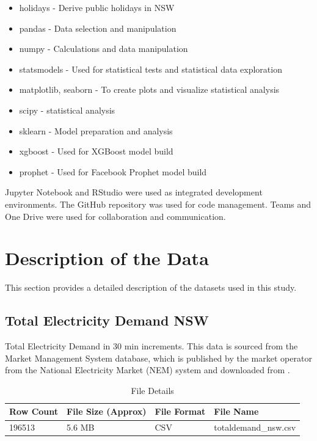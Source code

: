\documentclass[mstat,12pt]{unswthesis}
\begin{document}
\begin{itemize}
  \item holidays - Derive public holidays in NSW 
  \item pandas - Data selection and manipulation
  \item numpy - Calculations and data manipulation
  \item statsmodels - Used for statistical tests and statistical data exploration
  \item matplotlib, seaborn - To create plots and visualize statistical analysis
  \item scipy - statistical analysis
  \item sklearn - Model preparation and analysis
  \item xgboost - Used for XGBoost model build
  \item prophet - Used for Facebook Prophet model build
\end{itemize}

Jupyter Notebook and RStudio were used as integrated development
environments. The GitHub repository was used for code management. Teams
and One Drive were used for collaboration and communication.

\section{Description of the Data}\label{description-of-the-data}

This section provides a detailed description of the datasets used in
this study.

\subsection{Total Electricity Demand
NSW}\label{total-electricity-demand-nsw}

Total Electricity Demand in 30 min increments. This data is sourced from
the Market Management System database, which is published by the market
operator from the National Electricity Market (NEM) system and
downloaded from \cite{UNSW_project}.

\begin{table}[h]
\centering
\caption{File Details}
\tiny
\begin{tabular}{@{}|l|l|l|l|@{}}
\toprule
\textbf{Row Count} & \textbf{File Size (Approx)} & \textbf{File Format} & \textbf{File Name}   \\ \midrule
196513             & 5.6 MB                      & CSV                  & totaldemand\_nsw.csv \\ \bottomrule
\end{tabular}
\end{table}
\end{document}
